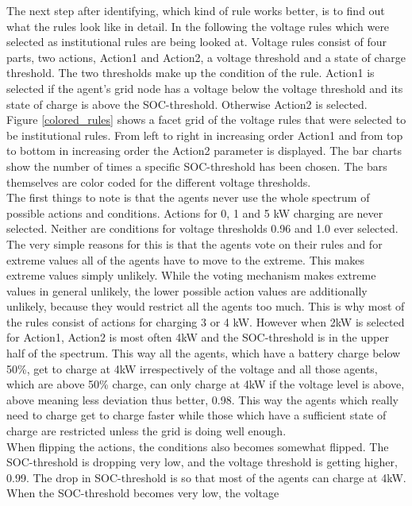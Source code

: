 \documentclass[a4paper]{article}
\begin{document}
The next step after identifying, which kind of rule works better, is to find out what the rules look like in detail. In the following 
the voltage rules which were selected as institutional rules are being looked at. Voltage rules consist of four parts, 
two actions, Action1 and Action2,
a voltage threshold and a state of charge threshold. The two thresholds make up the condition of the rule. Action1 is selected if 
the agent's grid node has a voltage below the voltage threshold and its state of charge is above the SOC-threshold. Otherwise Action2 is 
selected. \\
Figure \ref{colored_rules} shows a facet grid of the voltage rules that were selected to be institutional rules. From left to right in 
increasing order Action1 and from top to bottom in increasing order the Action2 parameter is displayed. The bar charts show the number
of times a specific SOC-threshold has been chosen. The bars themselves are color coded for the different voltage thresholds. \\
The first things to note is that the agents never use the whole spectrum of possible actions and conditions. Actions for 0, 1 and 5 kW 
charging are never selected. Neither are conditions for voltage thresholds 0.96 and 1.0 ever selected. 
The very simple reasons for this is that the agents vote on their rules and for extreme values all of the agents 
have to move to the extreme. This makes extreme values simply unlikely. While the voting mechanism makes extreme values in general 
unlikely, the lower possible action values are additionally unlikely, because they would restrict all the agents too much. This is why 
most of the rules  consist of actions for charging 3 or 4 kW. However when 2kW is selected for Action1, Action2 is most often 4kW and 
the SOC-threshold is in the upper half of the spectrum. This way all the agents, which have a battery charge below 50\%, get to 
charge at 4kW irrespectively of the voltage and all those agents, which are above 50\% charge, can only charge at 4kW if the voltage 
level is above, above meaning less deviation thus better, 0.98. This way the agents which really need to charge get to charge faster 
while those which have a sufficient state of charge are restricted unless the grid is doing well enough. \\
When flipping the actions, the conditions also becomes somewhat flipped. The SOC-threshold is dropping very low, and the voltage threshold
is getting higher, 0.99. 
The drop in SOC-threshold is so that most of the agents can charge at 4kW. When the SOC-threshold becomes very low, the voltage
\end{document}
